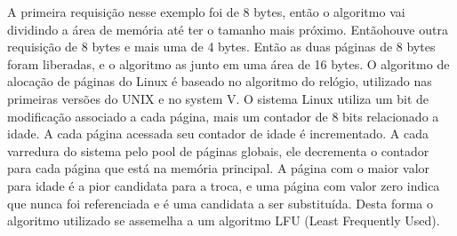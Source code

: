 A primeira requisição nesse exemplo foi de 8 bytes, então o algoritmo vai dividindo a área de memória até ter o tamanho mais próximo. Entãohouve outra requisição de 8 bytes e mais uma de 4 bytes. Então as duas páginas de 8 bytes foram liberadas, e o algoritmo as junto em uma área de 16 bytes.
O algoritmo de alocação de páginas do Linux é baseado no algoritmo do relógio, utilizado nas primeiras versões do UNIX e no system V. O sistema Linux utiliza um bit de modificação associado a cada página, mais um contador de 8 bits relacionado a idade. A cada página acessada seu contador de idade é incrementado. A cada varredura do sistema pelo pool de páginas globais, ele decrementa o contador para cada página que está na memória principal. A página com o maior valor para idade é a pior candidata para a troca, e uma página com valor zero indica que nunca foi referenciada e é uma candidata a ser substituída. Desta forma o algoritmo utilizado se assemelha a um algoritmo LFU (Least Frequently Used).
